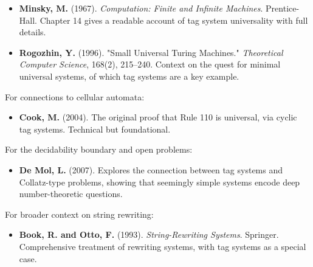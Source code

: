 \begin{itemize}
\item \textbf{Minsky, M.} (1967). \textit{Computation: Finite and Infinite Machines}. Prentice-Hall. Chapter 14 gives a readable account of tag system universality with full details.
\end{itemize}

\begin{itemize}
\item \textbf{Rogozhin, Y.} (1996). "Small Universal Turing Machines." \textit{Theoretical Computer Science}, 168(2), 215--240. Context on the quest for minimal universal systems, of which tag systems are a key example.
\end{itemize}

For connections to cellular automata:

\begin{itemize}
\item \textbf{Cook, M.} (2004). The original proof that Rule 110 is universal, via cyclic tag systems. Technical but foundational.
\end{itemize}

For the decidability boundary and open problems:

\begin{itemize}
\item \textbf{De Mol, L.} (2007). Explores the connection between tag systems and Collatz-type problems, showing that seemingly simple systems encode deep number-theoretic questions.
\end{itemize}

For broader context on string rewriting:

\begin{itemize}
\item \textbf{Book, R. and Otto, F.} (1993). \textit{String-Rewriting Systems}. Springer. Comprehensive treatment of rewriting systems, with tag systems as a special case.
\end{itemize}
